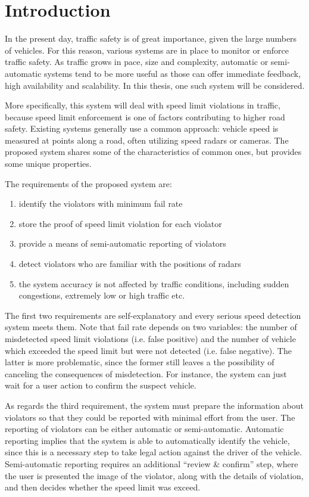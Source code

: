 \documentclass[times, utf8, zavrsni]{fer}
\begin{document}
\tableofcontents

\chapter{Introduction}
In the present day, traffic safety is of great importance, given the large
numbers of vehicles. For this reason, various systems are in place to monitor or
enforce traffic safety. As traffic grows in pace, size and complexity, automatic
or semi-automatic systems tend to be more useful as those can offer immediate
feedback, high availability and scalability. In this thesis, one such system
will be considered.

More specifically, this system will deal with speed limit violations in traffic,
because speed limit enforcement is one of factors contributing to higher road
safety. Existing systems generally use a common approach: vehicle speed is
measured at points along a road, often utilizing speed radars or cameras. The
proposed system shares some of the characteristics of common ones, but
provides some unique properties. 

The requirements of the proposed system are:
\begin{enumerate}
  \item identify the violators with minimum fail rate
  \item store the proof of speed limit violation for each violator
  \item provide a means of semi-automatic reporting of violators
  \item detect violators who are familiar with the positions of radars
  \item the system accuracy is not affected by traffic conditions, including
  	sudden congestions, extremely low or high traffic etc.
\end{enumerate}
The first two requirements are self-explanatory and every serious
speed detection system meets them. Note that fail rate depends on two
variables: the number of misdetected speed limit violations (i.e. false positive) and the number of vehicle
which exceeded the speed limit but were not detected (i.e. false negative).
The latter is more problematic, since the former still leaves a the possibility
of canceling the consequences of misdetection. For instance, the system can just
wait for a user action to confirm the suspect vehicle.

As regards the third requirement, the system must prepare the information
about violators so that they could be reported with minimal effort from the
user. The reporting of violators can be either automatic or semi-automatic.
Automatic reporting implies that the system is able to automatically
identify the vehicle, since this is a necessary step to take legal action
against the driver of the vehicle. Semi-automatic reporting requires an
additional ``review \& confirm'' step, where the user is presented the image of
the violator, along with the details of violation, and then decides whether the
speed limit was exceed.
\end{document}
